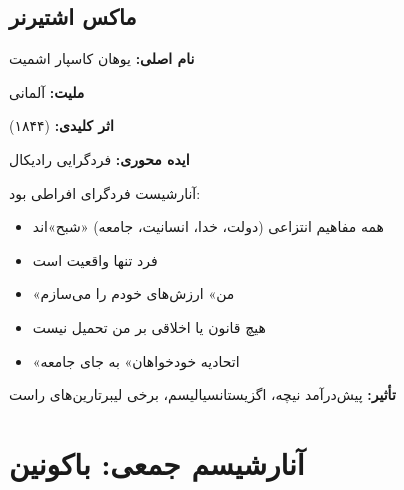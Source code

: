 \subsection{ماکس اشتیرنر}

\begin{personbox}

\textbf{نام اصلی:} یوهان کاسپار اشمیت

\textbf{ملیت:} آلمانی

\textbf{اثر کلیدی:}  (۱۸۴۴)

\textbf{ایده محوری:} فردگرایی رادیکال

\mediumspace

 آنارشیست فردگرای افراطی بود:

\begin{itemize}[nosep]
    \item همه مفاهیم انتزاعی (دولت، خدا، انسانیت، جامعه) «شبح»اند
    \item فرد تنها واقعیت است
    \item «من» ارزش‌های خودم را می‌سازم
    \item هیچ قانون یا اخلاقی بر من تحمیل نیست
    \item «اتحادیه خودخواهان» به جای جامعه
\end{itemize}

\mediumspace

\textbf{تأثیر:} پیش‌درآمد نیچه، اگزیستانسیالیسم، برخی لیبرتارین‌های راست
\end{personbox}

\section{آنارشیسم جمعی: باکونین}

